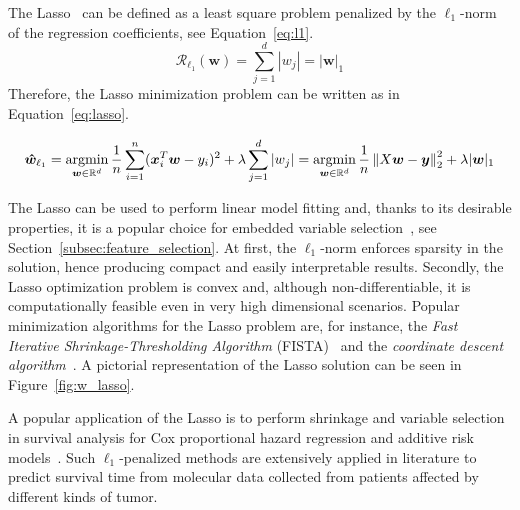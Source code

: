 			The Lasso~\cite{tibshirani1996regression} can be defined as a least square problem penalized by the $\ell_1$-norm of the regression coefficients, see Equation~\eqref{eq:l1}.
			\begin{equation}\label{eq:l1}
				\mathcal{R}_{\mbox{$\ell_1$}}(\bm{w}) = \sum_{j=1}^d |w_j| = |\bm{w}|_1
			\end{equation}
			Therefore, the Lasso minimization problem can be written as in Equation~\eqref{eq:lasso}.

			\begin{equation} \label{eq:lasso}
				\bm{\hat w}_{\ell_1} = \mathop{\mathrm{argmin}}\limits_{\bm{w} \in \mathbb{R}^d} \frac{1}{n} \sum_{i=1}^n (\bm{x}_i^T\bm{w} - y_i)^2 + \lambda  \sum_{j=1}^d |w_j| = \mathop{\mathrm{argmin}}\limits_{\bm{w} \in \mathbb{R}^d} \frac{1}{n} \left\lVert X\bm{w} - \bm{y}\right\rVert_2^2 + \lambda |\bm{w}|_1
			\end{equation}

			The Lasso can be used to perform linear model fitting and, thanks to its desirable properties, it is a popular choice for embedded variable selection~\cite{guyon2003introduction}, see Section~\ref{subsec:feature_selection}. At first, the $\ell_1$-norm enforces sparsity in the solution, hence producing compact and easily interpretable results. Secondly, the Lasso optimization problem is convex and, although non-differentiable, it is computationally feasible even in very high dimensional scenarios. Popular minimization algorithms for the Lasso problem are, for instance, the \textit{Fast Iterative Shrinkage-Thresholding Algorithm}  (\ac{FISTA})~\cite{beck2009fast} and the \textit{coordinate descent algorithm}~\cite{wu2008coordinate}. A pictorial representation of the Lasso solution can be seen in Figure~\ref{fig:w_lasso}.

			A popular application of the Lasso is to perform shrinkage and variable selection in survival analysis for Cox proportional hazard regression \cite{tang2017spike, gui2005penalized, tibshirani1997lasso} and additive risk models~\cite{ma2007additive}.
			Such $\ell_1$-penalized methods are extensively applied in literature to predict survival time from molecular data collected from patients affected by different kinds of tumor.

